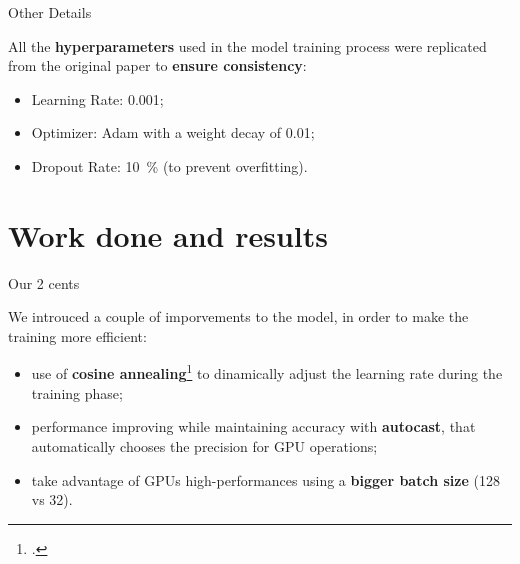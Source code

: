 	\begin{frame}{Other Details}

		All the \textbf{hyperparameters} used in the model training process were replicated from the original paper to
		\textbf{ensure consistency}:

		\begin{itemize}
			\item Learning Rate: \SI{0.001}{};
			\item Optimizer: Adam with a weight decay of \SI{0.01}{};
			\item Dropout Rate: \SI{10}{\percent} (to prevent overfitting).
		\end{itemize}

	\end{frame}

\section[Work done and results]{Work done and results}	

	\begin{frame}{Our 2 cents}

		We introuced a couple of imporvements to the model, in order to make the training more efficient:

		\begin{itemize}
		\item {use of \textbf{cosine annealing}\footcite{DBLP:journals/corr/LoshchilovH16a} to dinamically adjust the
  		learning rate during the training phase;}
		\item {performance improving while maintaining accuracy with \textbf{autocast}, that automatically chooses
  			the precision for GPU operations;}
		\item take advantage of GPUs high-performances using a \textbf{bigger batch size} (128 vs 32).
		\end{itemize}

	\end{frame}


